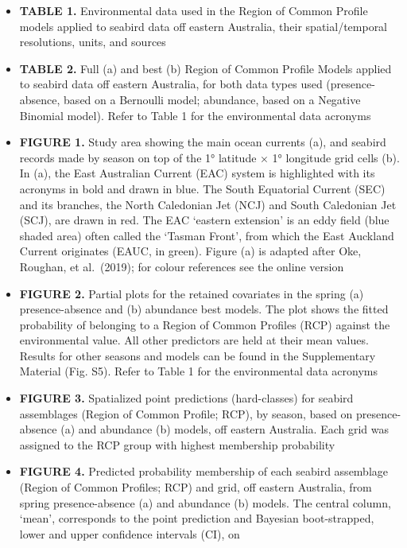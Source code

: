 \documentclass{article}
\providecommand{\tightlist}{%
  \setlength{\itemsep}{0pt}\setlength{\parskip}{0pt}}
\begin{document}
\begin{itemize}
\tightlist
\item
  \textbf{TABLE 1.} Environmental data used in the Region of Common
  Profile models applied to seabird data off eastern Australia, their
  spatial/temporal resolutions, units, and sources
\item
  \textbf{TABLE 2.} Full (a) and best (b) Region of Common Profile
  Models applied to seabird data off eastern Australia, for both data
  types used (presence-absence, based on a Bernoulli model; abundance,
  based on a Negative Binomial model). Refer to Table 1 for the
  environmental data acronyms
\item
  \textbf{FIGURE 1.} Study area showing the main ocean currents (a), and
  seabird records made by season on top of the 1° latitude × 1°
  longitude grid cells (b). In (a), the East Australian Current (EAC)
  system is highlighted with its acronyms in bold and drawn in blue. The
  South Equatorial Current (SEC) and its branches, the North Caledonian
  Jet (NCJ) and South Caledonian Jet (SCJ), are drawn in red. The EAC
  `eastern extension' is an eddy field (blue shaded area) often called
  the `Tasman Front', from which the East Auckland Current originates
  (EAUC, in green). Figure (a) is adapted after Oke, Roughan, et
  al.~(2019); for colour references see the online version
\item
  \textbf{FIGURE 2.} Partial plots for the retained covariates in the
  spring (a) presence-absence and (b) abundance best models. The plot
  shows the fitted probability of belonging to a Region of Common
  Profiles (RCP) against the environmental value. All other predictors
  are held at their mean values. Results for other seasons and models
  can be found in the Supplementary Material (Fig. S5). Refer to Table 1
  for the environmental data acronyms
\item
  \textbf{FIGURE 3.} Spatialized point predictions (hard-classes) for
  seabird assemblages (Region of Common Profile; RCP), by season, based
  on presence-absence (a) and abundance (b) models, off eastern
  Australia. Each grid was assigned to the RCP group with highest
  membership probability
\item
  \textbf{FIGURE 4.} Predicted probability membership of each seabird
  assemblage (Region of Common Profiles; RCP) and grid, off eastern
  Australia, from spring presence-absence (a) and abundance (b) models.
  The central column, `mean', corresponds to the point prediction and
  Bayesian boot-strapped, lower and upper confidence intervals (CI), on

\end{itemize}
\end{document}
